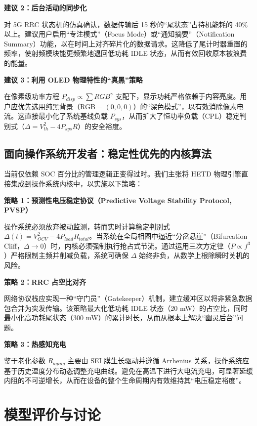 \documentclass[11pt,a4paper]{ctexart}
\begin{document}
\noindent\textbf{建议 2：后台活动的同步化}

对 5G RRC 状态机的仿真确认，数据传输后 15 秒的“尾状态”占待机能耗的 40\% 以上。建议用户启用“专注模式”（Focus Mode）或“通知摘要”（Notification Summary）功能，以在时间上对齐碎片化的数据请求。这降低了尾计时器重置的频率，使射频模块能更频繁地退回低功耗 IDLE 状态，从而有效回收原本被浪费的能量。

\noindent\textbf{建议 3：利用 OLED 物理特性的“真黑”策略}

在像素级功率方程 $P_{disp} \propto \sum RGB^{\gamma}$ 支配下，显示功耗严格依赖于内容亮度。用户应优先选用纯黑背景（RGB$=(0,0,0)$）的“深色模式”，以有效消除像素电流。这直接最小化了系统基线负载 $P_{sys}$，从而扩大了恒功率负载（CPL）稳定判别式（$\Delta = V_{th}^2 - 4P_{sys}R$）的安全裕度。

\subsection{面向操作系统开发者：稳定性优先的内核算法}

当前仅依赖 SOC 百分比的管理逻辑正变得过时。我们主张将 HETD 物理引擎直接集成到操作系统内核中，以实施以下策略：

\noindent\textbf{策略 1：预测性电压稳定协议（Predictive Voltage Stability Protocol, PVSP）}

操作系统必须放弃被动监测，转而实时计算稳定判别式 $\Delta(t) = V_{OCV}^2 - 4P_{load}R_{total}$。当系统在全局相图中逼近“分岔悬崖”（Bifurcation Cliff，$\Delta \rightarrow 0$）时，内核必须强制执行抢占式节流。通过运用三次方定律（$P \propto f^3$）严格限制主频并削减负载，系统可确保 $\Delta$ 始终非负，从数学上根除瞬时关机的风险。

\noindent\textbf{策略 2：RRC 占空比对齐}

网络协议栈应实现一种“守门员”（Gatekeeper）机制，建立缓冲区以将非紧急数据包合并为突发传输。该策略最大化低功耗 IDLE 状态（20 mW）的占空比，同时最小化高功耗尾状态（300 mW）的累计时长，从而从根本上解决“幽灵后台”问题。

\noindent\textbf{策略 3：热感知充电}

鉴于老化参数 $R_{aging}$ 主要由 SEI 膜生长驱动并遵循 Arrhenius 关系，操作系统应基于历史温度分布动态调整充电曲线。避免在高温下进行大电流充电，可显著延缓内阻的不可逆增长，从而在设备的整个生命周期内有效维持其“电压稳定裕度”。

\section{模型评价与讨论}
\end{document}
